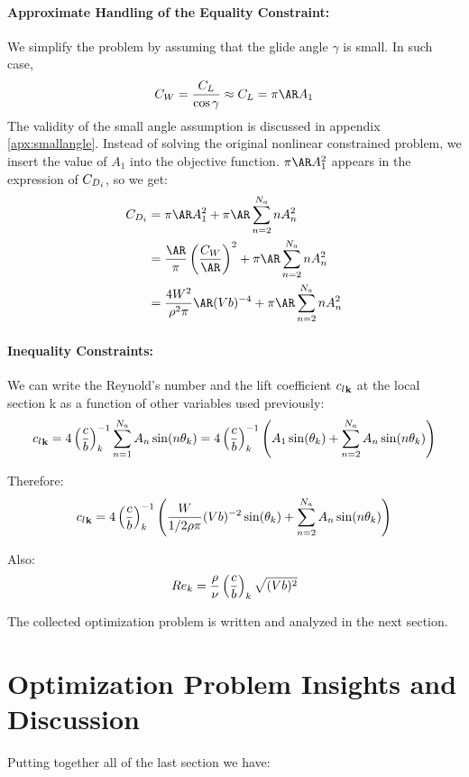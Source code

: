 \documentclass[letterpaper,12pt]{article}
\begin{document}
\paragraph{Approximate Handling of the Equality Constraint:} We simplify the problem by assuming that the glide angle $\gamma$ is small.
In such case,
\begin{align}
	C_W = \frac{C_L}{\cos \gamma} \approx C_L = \pi \AR A_1
	\label{eq:A1}
\end{align}
The validity of the small angle assumption is discussed in appendix \ref{apx:smallangle}.
Instead of solving the original nonlinear constrained problem, we insert the value of $A_1$
 into the objective function. $\pi \AR A_1^2$ appears in the expression of $C_{D_i}$, so we get: 
 \begin{align*}
	\CDi &= \pi \AR A_1^2 + \pi \AR \sum_{n=2}^{N_a} n A_n^2\\
		&=  \frac{\AR}{\pi} \left(\frac{C_W}{\AR} \right)^2 + \pi \AR \sum_{n=2}^{N_a} n A_n^2\\
		&=  \frac{4W^2}{\rho^2 \pi} \AR (Vb)^{-4} + \pi \AR \sum_{n=2}^{N_a} n A_n^2
 \end{align*}

\paragraph{Inequality Constraints:} We can write the Reynold's number and the lift coefficient ${c_l}_{\bf k}$ at the local section k as a function of other variables used previously:
$$
	{c_l}_{\bf k} = 4 \left( \frac c b \right)_{k}^{-1} \sum_{n=1}^{N_a} A_n \sin(n \theta_k)
	 = 4 \left( \frac c b \right)_{k}^{-1} \left(A_1 \sin(\theta_k) + \sum_{n=2}^{N_a} A_n \sin(n \theta_k) \right)
$$

\noindent Therefore:
$${c_l}_{\bf k} = 4 \left( \frac c b \right)_{k}^{-1} \left(\frac{W}{1/2 \rho \pi} (Vb)^{-2} \sin(\theta_k) + \sum_{n=2}^{N_a} A_n \sin(n \theta_k) \right) $$

\noindent Also:
$$Re_{k} = \frac{\rho}{\nu}\left( \frac c b \right)_{k}\sqrt{(Vb)^2} $$


The collected optimization problem is written and analyzed in the next section.

\section{Optimization Problem Insights and Discussion}

Putting together all of the last section we have:
\end{document}
